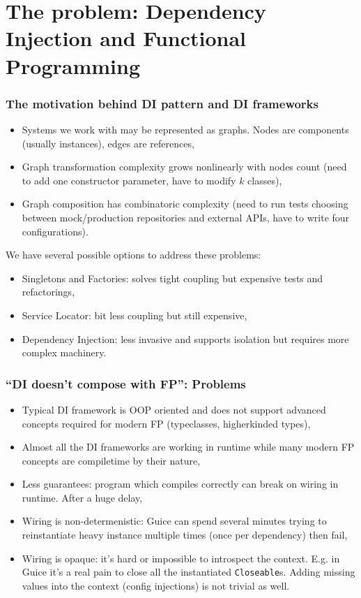 \documentclass[usenames,dvipsnames]{beamer}
\begin{document}
\section{The problem: Dependency Injection and Functional Programming}

\begin{frame}
\frametitle{The motivation behind DI pattern and DI frameworks}
\begin{itemize}
\item Systems we work with may be represented as graphs. Nodes are components (usually instances), edges are references,
\item Graph transformation complexity grows non\-linearly with nodes count (need to add one constructor parameter, have to modify $k$ classes),
\item Graph composition has combinatoric complexity (need to run tests choosing between mock/production repositories and external APIs, have to write four configurations).
\end{itemize}

We have several possible options to address these problems:

\begin{itemize}
\item Singletons and Factories: solves tight coupling but expensive tests and refactorings,
\item Service Locator: bit less coupling but still expensive,
\item Dependency Injection: less invasive and supports isolation but requires more complex machinery.
\end{itemize}

\end{frame}

\begin{frame}
\frametitle{``DI doesn't compose with FP'': Problems}
\begin{itemize}
\item Typical DI framework is OOP oriented and does not support advanced concepts required for modern FP (typeclasses, higher\-kinded types),
\item Almost all the DI frameworks are working in runtime while many modern FP concepts are compile\-time by their nature,
\item Less guarantees: program which compiles correctly can break on wiring in runtime. After a huge delay,
\item Wiring is non-determenistic: Guice can spend several minutes trying to re\-instantiate heavy instance multiple times (once per dependency) then fail,
\item Wiring is opaque: it's hard or impossible to introspect the context. E.g. in Guice it's a real pain to close all the instantiated \texttt{Closeable}s.
      Adding missing values into the context (config injections) is not trivial as well.
\end{itemize}
\end{frame}
\end{document}
